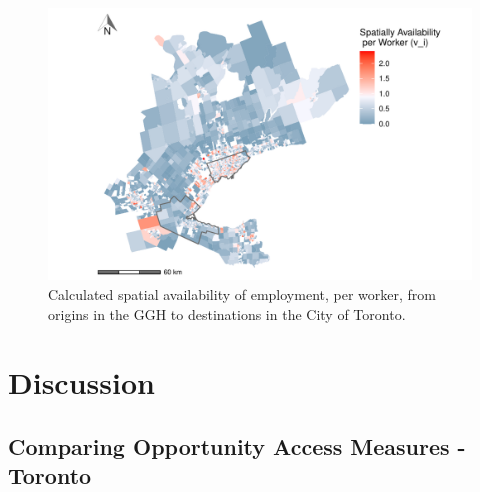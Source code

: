\documentclass[]{elsarticle} %
\begin{document}
\begin{figure}
\includegraphics[width=1\linewidth]{Spatial-Availability_files/figure-latex/plot-avail-GGH-TTS-per-worker-1} \caption{\label{fig:plot-avail-GGH-TTS-per-worker}Calculated spatial availability of employment, per worker, from origins in the GGH to destinations in the City of Toronto.}\label{fig:plot-avail-GGH-TTS-per-worker}
\end{figure}

\hypertarget{discussion}{%
\section{Discussion}\label{discussion}}

\hypertarget{comparing-opportunity-access-measures---toronto}{%
\subsection{Comparing Opportunity Access Measures -
Toronto}\label{comparing-opportunity-access-measures---toronto}}
\end{document}
